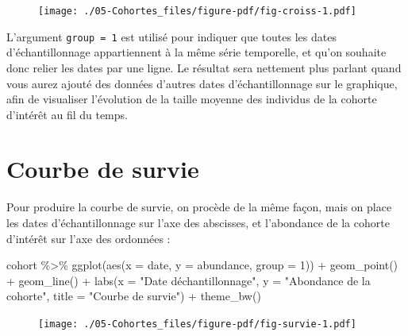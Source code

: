 \documentclass[
  a4paper,
  DIV=11,
  numbers=noendperiod,
  oneside]{scrreprt}
\newenvironment{Shaded}{}{}
\newcommand{\AttributeTok}[1]{\textcolor[rgb]{0.84,0.23,0.29}{#1}}
\newcommand{\DecValTok}[1]{\textcolor[rgb]{0.00,0.36,0.77}{#1}}
\newcommand{\FunctionTok}[1]{\textcolor[rgb]{0.44,0.26,0.76}{#1}}
\newcommand{\NormalTok}[1]{\textcolor[rgb]{0.14,0.16,0.18}{#1}}
\newcommand{\SpecialCharTok}[1]{\textcolor[rgb]{0.00,0.36,0.77}{#1}}
\newcommand{\StringTok}[1]{\textcolor[rgb]{0.01,0.18,0.38}{#1}}
\begin{document}
\begin{figure}


{\centering \texttt{[image: ./05-Cohortes\_files/figure-pdf/fig-croiss-1.pdf]}

}

\end{figure}

L'argument \texttt{group\ =\ 1} est utilisé pour indiquer que toutes les
dates d'échantillonnage appartiennent à la même série temporelle, et
qu'on souhaite donc relier les dates par une ligne. Le résultat sera
nettement plus parlant quand vous aurez ajouté des données d'autres
dates d'échantillonnage sur le graphique, afin de visualiser l'évolution
de la taille moyenne des individus de la cohorte d'intérêt au fil du
temps.

\hypertarget{courbe-de-survie}{%
\section{Courbe de survie}\label{courbe-de-survie}}

Pour produire la courbe de survie, on procède de la même façon, mais on
place les dates d'échantillonnage sur l'axe des abscisses, et
l'abondance de la cohorte d'intérêt sur l'axe des ordonnées :

\begin{Shaded}
\begin{Highlighting}[]
\NormalTok{cohort }\SpecialCharTok{\%\textgreater{}\%}
  \FunctionTok{ggplot}\NormalTok{(}\FunctionTok{aes}\NormalTok{(}\AttributeTok{x =}\NormalTok{ date, }\AttributeTok{y =}\NormalTok{ abundance, }\AttributeTok{group =} \DecValTok{1}\NormalTok{)) }\SpecialCharTok{+}
  \FunctionTok{geom\_point}\NormalTok{() }\SpecialCharTok{+}
  \FunctionTok{geom\_line}\NormalTok{() }\SpecialCharTok{+}
  \FunctionTok{labs}\NormalTok{(}\AttributeTok{x =} \StringTok{"Date d\textquotesingle{}échantillonnage"}\NormalTok{,}
       \AttributeTok{y =} \StringTok{"Abondance de la cohorte"}\NormalTok{,}
       \AttributeTok{title =} \StringTok{"Courbe de survie"}\NormalTok{) }\SpecialCharTok{+}
  \FunctionTok{theme\_bw}\NormalTok{()}
\end{Highlighting}
\end{Shaded}

\begin{figure}[H]


{\centering \texttt{[image: ./05-Cohortes\_files/figure-pdf/fig-survie-1.pdf]}

}

\end{figure}
\end{document}
